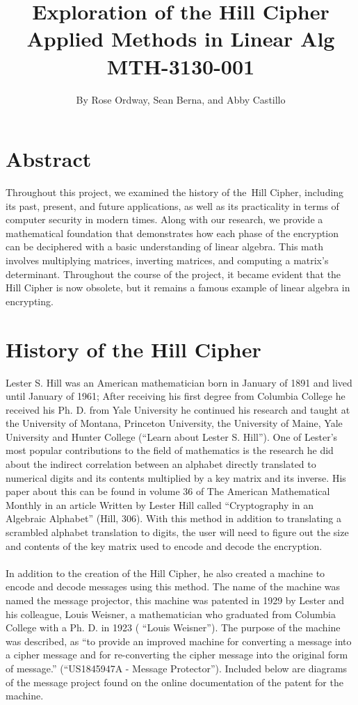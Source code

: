 \documentclass{article}
\title{
  Exploration of the Hill Cipher\\
  \large Applied Methods in Linear Alg MTH-3130-001}
\author{By Rose Ordway, Sean Berna, and
Abby Castillo
}
\begin{document}
\renewcommand\arraystretch{1.2}
\doublespacing
\maketitle
\section*{Abstract}
Throughout this project, we examined the history of the Hill Cipher, including its past, present, and future applications, as well as its practicality in terms of computer security in modern times. Along with our research, we provide a mathematical foundation that demonstrates how each phase of the encryption can be deciphered with a basic understanding of linear algebra. This math involves multiplying matrices, inverting matrices, and computing a matrix's determinant. Throughout the course of the project, it became evident that the Hill Cipher is now obsolete, but it remains a famous example of linear algebra in encrypting. 

\section*{History of the Hill Cipher}
	\noindent Lester S. Hill was an American mathematician born in January of 1891 and lived until January of 1961; After receiving his first degree from Columbia College he received his Ph. D. from Yale University he continued his research and taught at the University of Montana, Princeton University, the University of Maine, Yale University and Hunter College (“Learn about Lester S. Hill”). One of Lester's most popular contributions to the field of mathematics is the research he did about the indirect correlation between an alphabet directly translated to numerical digits and its contents multiplied by a key matrix and its inverse. His paper about this can be found in volume 36 of The American Mathematical Monthly in an article Written by Lester Hill called “Cryptography in an Algebraic Alphabet” (Hill, 306). With this method in addition to translating a scrambled alphabet translation to digits, the user will need to figure out the size and contents of the key matrix used to encode and decode the encryption. 
 \\
 \\
In addition to the creation of the Hill Cipher, he also created a machine to encode and decode messages using this method. The name of the machine was named the message projector, this machine was patented in 1929 by Lester and his colleague, Louis Weisner, a mathematician who graduated from Columbia College with a Ph. D. in 1923 ( “Louis Weisner”). The purpose of the machine was described, as “to provide an improved machine for converting a message into a cipher message and for re-converting the cipher message into the original form of message.” (“US1845947A - Message Protector”).  Included below are diagrams of the message project found on the online documentation of the patent for the machine.
\end{document}
